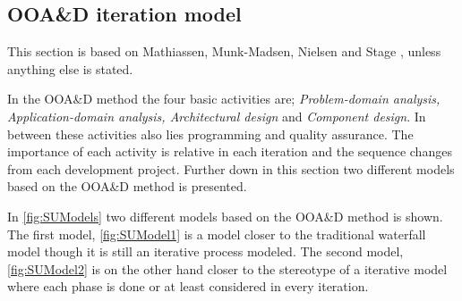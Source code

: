 \subsection{OOA\&D iteration model}\label{sec:Iterative3}
This section is based on Mathiassen, Munk-Madsen, Nielsen and Stage \cite{Rod-Aalborg}, unless anything else is stated.

In the OOA\&D method the four basic activities are; \textit{Problem-domain analysis, Application-domain analysis, Architectural design} and \textit{Component design}.
In between these activities  also lies programming and quality assurance.
The importance of each activity is relative in each iteration and the sequence changes from each development project.
Further down in this section two different models based on the OOA\&D method is presented.


In \cref{fig:SUModels} two different models based on the OOA\&D method is shown.
The first model, \cref{fig:SUModel1} is a model closer to the traditional waterfall model though it is still an iterative process modeled.
The second model, \cref{fig:SUModel2} is on the other hand closer to the stereotype of a iterative model where each phase is done or at least considered in every iteration.

